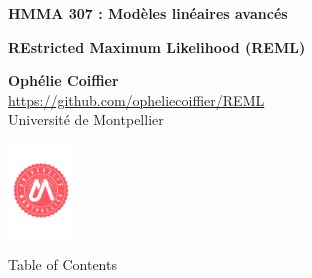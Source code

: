 \documentclass[unknownkeysallowed]{beamer}
\begin{document}



\begin{frame}
\bigskip
\bigskip
\begin{center}{
\LARGE\color{marron}
\textbf{HMMA 307 : Modèles linéaires avancés}
\textbf{ }\\
\vspace{0.5cm}
}

\color{marron}
\textbf{REstricted Maximum Likelihood (REML)}
\end{center}

\vspace{0.5cm}

\begin{center}
\textbf{Ophélie Coiffier} \\
\vspace{0.1cm}
\url{https://github.com/opheliecoiffier/REML}\\
\vspace{0.5cm}
Université de Montpellier \\
\end{center}

\centering
\includegraphics[width=0.13\textwidth]{./images/Logo.pdf}

\end{frame}






\begin{frame}{Table of Contents}
\tableofcontents[hideallsubsections]
\end{frame}
\end{document}
